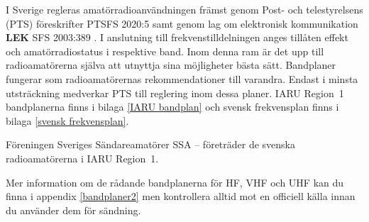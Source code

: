 I Sverige regleras amatörradioanvändningen främst genom Post- och
telestyrelsens (PTS) föreskrifter PTSFS 2020:5 \cite{PTSFS2020:5} samt genom lag
om elektronisk kommunikation \textbf{LEK} SFS 2003:389 \cite{SFS2003:389}.
I anslutning till frekvenstilldelningen anges tillåten effekt och
amatörradiostatus i respektive band.
Inom denna ram är det upp till radioamatörerna själva att utnyttja sina
möjligheter bästa sätt.
Bandplaner fungerar som radioamatörernas rekommendationer till varandra.
Endast i minsta utsträckning medverkar PTS till reglering inom dessa planer.
IARU Region~1 bandplanerna finns i bilaga \ref{IARU bandplan} och svensk
frekvensplan finns i bilaga \ref{svensk frekvensplan}.

Föreningen Sveriges Sändareamatörer SSA -- företräder de svenska
radioamatörerna i IARU Region~1.

Mer information om de rådande bandplanerna för HF, VHF och UHF kan du finna i
appendix \ref{bandplaner2} men kontrollera alltid mot en officiell källa innan
du använder dem för sändning.
